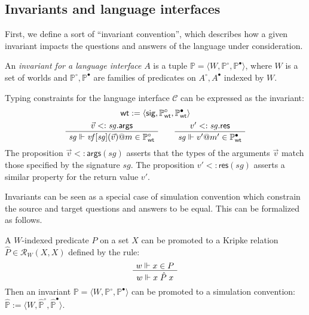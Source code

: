 \documentclass[acmsmall,screen,review,anonymous]{acmart}
\newcommand{\kw}[1]{\ensuremath{ \mathsf{#1} }}
\newcommand{\que}{\circ}
\newcommand{\ans}{\bullet}
\begin{document}

\subsection{Invariants and language interfaces} %

First, we define a sort of ``invariant convention'',
which describes how a given invariant impacts the questions and answers
of the language under consideration.

\begin{definition} %
An \emph{invariant for a language interface} $A$
is a tuple
$\mathbb{P} = \langle W, \mathbb{P}^\que, \mathbb{P}^\ans \rangle$,
where $W$ is a set of worlds
and $\mathbb{P}^\que, \mathbb{P}^\ans$
are families of predicates on $A^\que, A^\ans$
indexed by $W$.
\end{definition}

\begin{example} \label{ex:wt} %
Typing constraints for the language interface $\mathcal{C}$
can be expressed as the invariant:
\begin{gather*}
  \kw{wt} :=
    \langle
      \kw{sig},
      \mathbb{P}_\kw{wt}^\que,
      \mathbb{P}_\kw{wt}^\ans
    \rangle
  \\
  \AxiomC{$\vec{v} <: \mathit{sg}.\kw{args}$}
  \UnaryInfC{$\mathit{sg} \Vdash
    \mathit{vf}[\mathit{sg}](\vec{v})@m \in \mathbb{P}_\kw{wt}^\que$}
  \DisplayProof
  \qquad
  \AxiomC{$v' <: \mathit{sg}.\kw{res}$}
  \UnaryInfC{$\mathit{sg} \Vdash
    v'@m' \in \mathbb{P}_\kw{wt}^\ans$}
  \DisplayProof
\end{gather*}
The proposition $\vec{v} <: \kw{args}(\mathit{sg})$
asserts that the types of the arguments $\vec{v}$
match those specified by the signature $\mathit{sg}$.
The proposition $v' <: \kw{res}(\mathit{sg})$
asserts a similar property for the return value $v'$.
\end{example}

Invariants can be seen as a special case of simulation convention
which constrain the source and target questions and answers
to be equal.
This can be formalized as follows.

\begin{definition}
A $W$-indexed predicate $P$ on a set $X$
can be promoted to a Kripke relation
$\hat{P} \in \mathcal{R}_W(X, X)$
defined by the rule:
\[
  \AxiomC{$w \Vdash x \in P$}
  \UnaryInfC{$w \Vdash x \mathrel{\hat{P}} x$}
  \DisplayProof
\]
Then an invariant
$\mathbb{P} = \langle W, \mathbb{P}^\que, \mathbb{P}^\ans \rangle$
can be promoted to a simulation convention:
$\hat{\mathbb{P}} :=
 \langle W, \hat{\mathbb{P}}^\que, \hat{\mathbb{P}}^\ans \rangle$.
\end{definition}
\end{document}

